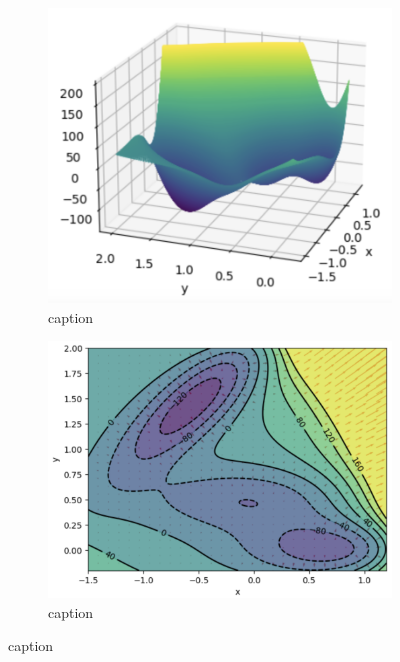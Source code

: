\documentclass{article}
\begin{document}
    \begin{figure}[H]
\begin{subfigure}{0.5\textwidth}
  \centering
  \includegraphics[width=0.8\linewidth]{images/MullerB-potential-plot-3d.png}
  \caption{ caption}
  \label{fig: description}
\end{subfigure}%
\begin{subfigure}{0.5\textwidth}
  \centering
  \includegraphics[width=0.8\linewidth]{images/MullerB-contour-with-grad-field.png}
  \caption{ caption}
  \label{fig:  description}
\end{subfigure}
\caption{ caption}
\label{fig:  label}
\end{figure}
\end{document}
